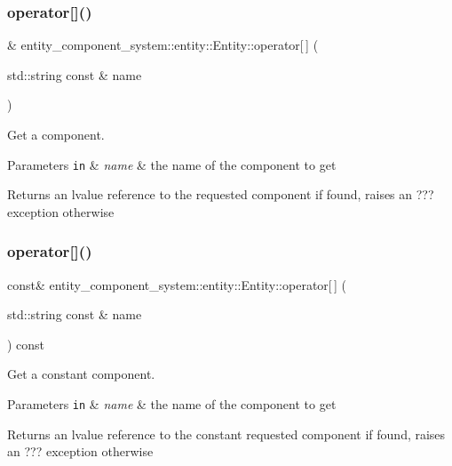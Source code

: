 \subsubsection{operator[]()\hspace{0.1cm}{\footnotesize\ttfamily [1/2]}}
{\footnotesize{}\& entity\+\_\+component\+\_\+system\+::entity\+::\+Entity\+::operator[$\,$] (\begin{DoxyParamCaption}\item[{std\+::string const \&}]{name }\end{DoxyParamCaption})\hspace{0.3cm}{\ttfamily [inline]}}



Get a component. 


\begin{DoxyParams}[1]{Parameters}
\mbox{\tt in}  & {\em name} & the name of the component to get \\
\hline
\end{DoxyParams}
\begin{DoxyReturn}{Returns}
an lvalue reference to the requested component if found, raises an ??? exception otherwise 
\end{DoxyReturn}
\label{classentity__component__system_1_1entity_1_1_entity_adccaf4342f8b0df3e61ec089be907e94} 
\subsubsection{operator[]()\hspace{0.1cm}{\footnotesize\ttfamily [2/2]}}
{\footnotesize{} const\& entity\+\_\+component\+\_\+system\+::entity\+::\+Entity\+::operator[$\,$] (\begin{DoxyParamCaption}\item[{std\+::string const \&}]{name }\end{DoxyParamCaption}) const\hspace{0.3cm}{\ttfamily [inline]}}



Get a constant component. 


\begin{DoxyParams}[1]{Parameters}
\mbox{\tt in}  & {\em name} & the name of the component to get \\
\hline
\end{DoxyParams}
\begin{DoxyReturn}{Returns}
an lvalue reference to the constant requested component if found, raises an ??? exception otherwise 
\end{DoxyReturn}
\label{classentity__component__system_1_1entity_1_1_entity_aacbd76a6d42dc5dc70fbd1638a149324} 
